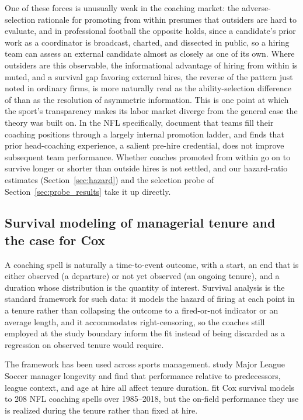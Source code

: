 \documentclass[12pt,USenglish]{article}
\begin{document}
One of these forces is unusually weak in the coaching market: the adverse-selection rationale for promoting from within presumes that outsiders are hard to evaluate, and in professional football the opposite holds, since a candidate's prior work as a coordinator is broadcast, charted, and dissected in public, so a hiring team can assess an external candidate almost as closely as one of its own. Where outsiders are this observable, the informational advantage of hiring from within is muted, and a survival gap favoring external hires, the reverse of the pattern just noted in ordinary firms, is more naturally read as the ability-selection difference of \citet{chan1996} than as the resolution of asymmetric information. This is one point at which the sport's transparency makes its labor market diverge from the general case the theory was built on. In the NFL specifically, \citet{farnell2021} document that teams fill their coaching positions through a largely internal promotion ladder, and \citet{roach2016} finds that prior head-coaching experience, a salient pre-hire credential, does not improve subsequent team performance. Whether coaches promoted from within go on to survive longer or shorter than outside hires is not settled, and our hazard-ratio estimates (Section~\ref{sec:hazard}) and the selection probe of Section~\ref{sec:probe_results} take it up directly.

\subsection{Survival modeling of managerial tenure and the case for Cox}
\label{sec:litcox}

A coaching spell is naturally a time-to-event outcome, with a start, an end that is either observed (a departure) or not yet observed (an ongoing tenure), and a duration whose distribution is the quantity of interest. Survival analysis is the standard framework for such data: it models the hazard of firing at each point in a tenure rather than collapsing the outcome to a fired-or-not indicator or an average length, and it accommodates right-censoring, so the coaches still employed at the study boundary inform the fit instead of being discarded as a regression on observed tenure would require.

The framework has been used across sports management. \citet{gilfix2020} study Major League Soccer manager longevity and find that performance relative to predecessors, league context, and age at hire all affect tenure duration. \citet{salaga2020} fit Cox survival models to 208 NFL coaching spells over 1985--2018, but the on-field performance they use is realized during the tenure rather than fixed at hire.
\end{document}
